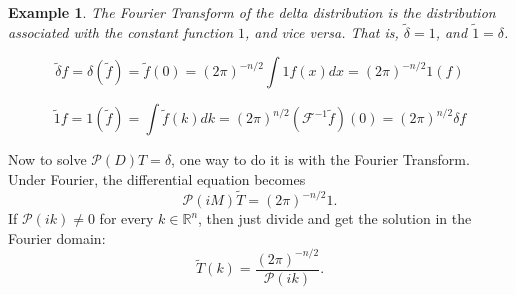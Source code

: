 \documentclass[letterpaper,twoside,11pt]{article}
\theoremstyle{mystyle}
\newtheorem*{ex}{Example}
\newcommand{\R}{{\mathbb R}}
\begin{document}
\begin{ex}
  The Fourier Transform of the delta distribution is the distribution associated with the constant function $1$, and vice versa. That is, $\tilde \delta = 1$, and $\tilde 1 = \delta$. 

  \[\tilde \delta f = \delta \left( {\tilde f} \right) = \tilde f\left( 0 \right) = {\left( {2\pi } \right)^{ - n/2}}\int 1 f\left( x \right)dx = {\left( {2\pi } \right)^{ - n/2}} 1\left( f \right)\]

  \[\tilde 1f = 1\left( {\tilde f} \right) = \int {\tilde f} \left( k \right)dk = {\left( {2\pi } \right)^{n/2}}\left( {{\mathcal{F}^{ - 1}}\tilde f} \right)\left( 0 \right) = {\left( {2\pi } \right)^{n/2}}\delta f\]


\end{ex}
Now to solve $\mathcal P(D) T = \delta$, one way to do it is with the Fourier Transform. Under Fourier, the differential equation becomes 
\[\mathcal P \left( iM \right) \tilde T = \left( 2\pi  \right)^{-n/2} 1.\]
If $\mathcal P(ik) \neq 0$ for every $k\in \R^n$, then just divide and get the solution in the Fourier domain: 
\[\tilde T(k) = \frac{\left( 2\pi \right)^{-n/2}}{\mathcal P\left( ik \right)}.\]
\end{document}
